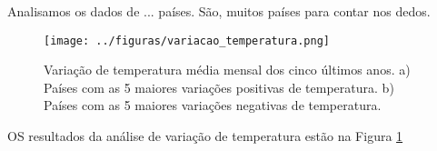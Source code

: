 \documentclass{article}
\begin{document}
Analisamos os dados de ... países. São, muitos países para contar nos dedos.

\begin{figure}[!tb]
    \centering
    \texttt{[image: ../figuras/variacao\_temperatura.png]}
    \caption{
    Variação de temperatura média mensal dos cinco últimos anos.
    a) Países com as 5 maiores variações positivas de temperatura.
    b) Países com as 5 maiores variações negativas de temperatura.
    }
    \label{fig:variacao}
\end{figure}

OS resultados da análise de variação de temperatura estão na Figura \ref{fig:variacao}



\end{document}
